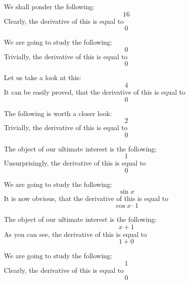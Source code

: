 \documentclass{article}
\begin{document}
We shall ponder the following:
\begin{equation}
16 
\end{equation}
Clearly, the derivative of this is equal to
\begin{equation}
0 
\end{equation}

We are going to study the following:
\begin{equation}
0 
\end{equation}
Trivially, the derivative of this is equal to
\begin{equation}
0 
\end{equation}

Let us take a look at this:
\begin{equation}
4 
\end{equation}
It can be easily proved, that the derivative of this is equal to
\begin{equation}
0 
\end{equation}

The following is worth a closer look:
\begin{equation}
2 
\end{equation}
Trivially, the derivative of this is equal to
\begin{equation}
0 
\end{equation}

The object of our ultimate interest is the following:
\begin{equation}
1 
\end{equation}
Unsurprisingly, the derivative of this is equal to
\begin{equation}
0 
\end{equation}

We are going to study the following:
\begin{equation}
\sin x 
\end{equation}
It is now obvious, that the derivative of this is equal to
\begin{equation}
\cos x \cdot 1 
\end{equation}

The object of our ultimate interest is the following:
\begin{equation}
x + 1 
\end{equation}
As you can see, the derivative of this is equal to
\begin{equation}
1 + 0 
\end{equation}

We are going to study the following:
\begin{equation}
1 
\end{equation}
Clearly, the derivative of this is equal to
\begin{equation}
0 
\end{equation}
\end{document}
